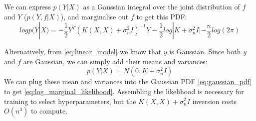 We can express $p(Y|X)$ as a Gaussian integral over the joint distribution of $f$ and $Y$ ($p(Y,f|X)$), and marginalise out $f$ to get this PDF:
\begin{equation} \label{eq:log_marginal_likelihood}
    log p(Y|X) = -\frac{1}{2}Y^T(K(X,X) + \sigma^2_nI)^{-1}Y - \frac{1}{2}log|K + \sigma^2_nI| - \frac{n}{2}log(2\pi)
\end{equation}

Alternatively, from \ref{eq:linear_model} we know that $y$ is Gaussian. Since both $y$ and $f$ are Gaussian, we can simply add their means and variances: 
\begin{equation*}
    p(Y|X) = N(0, K + \sigma^2_nI)
\end{equation*}
We can plug these mean and variances into the Gaussian PDF \ref{eq:gaussian_pdf} to get \ref{eq:log_marginal_likelihood}. Assembling the likelihood is necessary for training to select hyperparameters, but the $K(X, X) + \sigma^2_nI$ inversion costs $O(n^3)$ to compute. 


